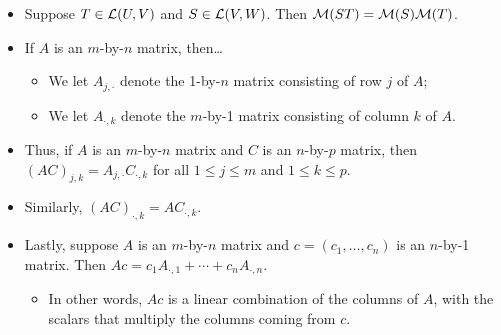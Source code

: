 \documentclass[../main.tex]{subfiles}
\begin{document}
\begin{itemize}
    \item Suppose $T\in\mathcal{L}(U,V)$ and $S\in\mathcal{L}(V,W)$. Then $\mathcal{M}(ST)=\mathcal{M}(S)\mathcal{M}(T)$.
    \item If $A$ is an $m$-by-$n$ matrix, then\dots
    \begin{itemize}
        \item We let $A_{j,\cdot}$ denote the 1-by-$n$ matrix consisting of row $j$ of $A$;
        \item We let $A_{\cdot,k}$ denote the $m$-by-1 matrix consisting of column $k$ of $A$.
    \end{itemize}
    \item Thus, if $A$ is an $m$-by-$n$ matrix and $C$ is an $n$-by-$p$ matrix, then $(AC)_{j,k}=A_{j,\cdot}C_{\cdot,k}$ for all $1\leq j\leq m$ and $1\leq k\leq p$.
    \item Similarly, $(AC)_{\cdot,k}=AC_{\cdot,k}$.
    \item Lastly, suppose $A$ is an $m$-by-$n$ matrix and $c=(c_1,\dots,c_n)$ is an $n$-by-1 matrix. Then $Ac=c_1A_{\cdot,1}+\cdots+c_nA_{\cdot,n}$.
    \begin{itemize}
        \item In other words, $Ac$ is a linear combination of the columns of $A$, with the scalars that multiply the columns coming from $c$.
    \end{itemize}
\end{itemize}
\end{document}
